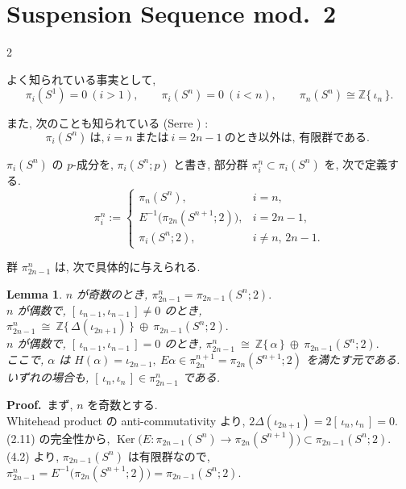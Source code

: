 \documentclass[10pt, leqno]{ltjsarticle}
\newcommand{\Ex}{E}        %
\newcommand{\gen}[1]{\{\,#1\,\}}       %
\newcommand{\Ker}{\operatorname{Ker}}
\newcommand{\pis}[2]{\pi_{#1}(#2)}       %
\numberwithin{equation}{section}
\theoremstyle{plain}
\newtheorem{lemma}[theorem]{Lemma}
\theoremstyle{definition}
\theoremstyle{remark}
\begin{document}
\setcounter{section}{3}
\section{Suspension Sequence mod.\ 2}

\begin{paracol}{2}

よく知られている事実として, 
\begin{equation}\label{4.1}
\pis{i}{S^1}=0\ (i>1),\qquad
\pis{i}{S^n}=0\ (i<n),\qquad
\pis{n}{S^n}\cong \mathbb{Z}\gen{\iota_n} .
\end{equation}

また, 次のことも知られている (Serre \cite{Serre1951}) :
\begin{equation}\label{4.2}
\pis{i}{S^n}\ \text{は,} \ i=n \ \text{または} \ 
i=2n-1 \ \text{のとき以外は, 有限群である. }
\end{equation}

\(\pis{i}{S^n}\) の $p$-成分を, $\pis{i}{S^n;p}$ と書き, 
部分群 $\pi_i^n\subset\pis{i}{S^n}$ を, 次で定義する. 
\begin{equation}\label{4.3}
\pi_i^n :=
\begin{cases}
\pis{n}{S^n}, & i=n,\\[2pt]
\Ex^{-1}\bigl(\pis{2n}{S^{n+1};2}\bigr), & i=2n-1,\\[2pt]
\pis{i}{S^n;2}, & i\ne n,\,2n-1 .
\end{cases}
\end{equation}

群 $\pi^n_{2n-1}$ は, 次で具体的に与えられる. 
\begin{lemma}\label{lem:4.1}
$n$ が奇数のとき,  $\pi_{2n-1}^n=\pis{2n-1}{S^n;2} .$\\
$n$ が偶数で, $[\,\iota_{n-1},\iota_{n-1}\,]\ne0$ のとき, 
\(
\pi_{2n-1}^n\ \cong\ \mathbb{Z}\gen{\Delta(\iota_{2n+1})}\ \oplus \ 
\pis{2n-1}{S^n;2} .
\)\\
$n$ が偶数で, $[\,\iota_{n-1},\iota_{n-1}\,]=0$ のとき, 
\(
\pi_{2n-1}^n\ \cong\ \mathbb{Z}\gen{\alpha}\ \oplus \
\pis{2n-1}{S^n;2} .
\)\\
ここで, \(\alpha\) は 
\(H(\alpha)=\iota_{2n-1},\ E\alpha\in\pi_{2n}^{n+1}=\pi_{2n}(S^{n+1};2)\)
を満たす元である. \\
いずれの場合も, $[\,\iota_n,\iota_n\,]\in \pi_{2n-1}^n$ である. 
\end{lemma}

\noindent
\textbf{Proof.}\
まず, $n$ を奇数とする. \\
Whitehead product の anti-commutativity より,
$2\Delta(\iota_{2n+1})=2[\,\iota_n,\iota_n\,]=0 .$\\
(2.11) の完全性から,
\(
\Ker\bigl(\Ex:\pis{2n-1}{S^n}\to\pis{2n}{S^{n+1}}\bigr)
\subset\pis{2n-1}{S^n;2}.
\)\\
(4.2) より, $\pis{2n-1}{S^n}$ は有限群なので, 
\(
\pi_{2n-1}^n=\Ex^{-1}\bigl(\pis{2n}{S^{n+1};2}\bigr)=\pis{2n-1}{S^n;2} .
\)


\end{paracol}
\end{document}

